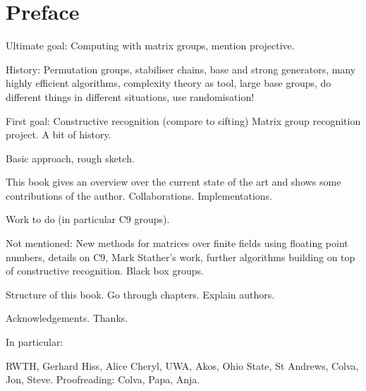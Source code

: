 
\chapter*{Preface}

Ultimate goal: Computing with matrix groups, mention projective.

History: Permutation groups, stabiliser chains, base and strong generators,
many highly efficient algorithms, complexity theory as tool, large
base groups, do different things in different situations, use
randomisation!

First goal: Constructive recognition (compare to sifting)
Matrix group recognition project. A bit of history.

Basic approach, rough sketch.

This book gives an overview over the current state of the art and
shows some contributions of the author. Collaborations.
Implementations.

Work to do (in particular C9 groups).

Not mentioned: New methods for matrices over finite fields using
floating point numbers, details on C9, Mark Stather's work, further
algorithms building on top of constructive recognition. Black box
groups.

Structure of this book. Go through chapters. Explain authors.

Acknowledgements. Thanks.

In particular:

RWTH, Gerhard Hiss, Alice Cheryl, UWA, Akos, Ohio State, St Andrews, Colva, Jon,
Steve. Proofreading: Colva, Papa, Anja.

